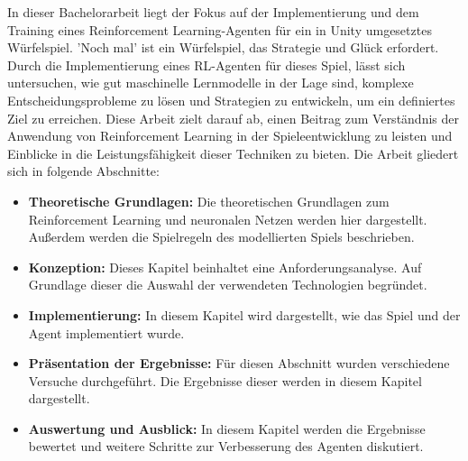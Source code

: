In dieser Bachelorarbeit liegt der Fokus auf der Implementierung und dem Training eines Reinforcement Learning-Agenten für ein in Unity umgesetztes Würfelspiel. 'Noch mal' ist ein Würfelspiel, das Strategie und Glück erfordert.  Durch die Implementierung eines RL-Agenten für dieses Spiel, lässt sich untersuchen, wie gut maschinelle Lernmodelle in der Lage sind, komplexe Entscheidungsprobleme zu lösen und Strategien zu entwickeln, um ein definiertes Ziel zu erreichen. Diese Arbeit zielt darauf ab, einen Beitrag zum Verständnis der Anwendung von Reinforcement Learning in der Spieleentwicklung zu leisten und Einblicke in die Leistungsfähigkeit dieser Techniken zu bieten. 
\newpage
Die Arbeit gliedert sich in folgende Abschnitte:
\begin{itemize}[noitemsep]
\item \textbf{Theoretische Grundlagen:} Die theoretischen Grundlagen zum Reinforcement Learning und neuronalen Netzen werden hier dargestellt. Außerdem werden die Spielregeln des modellierten Spiels beschrieben.
\item \textbf{Konzeption:} Dieses Kapitel beinhaltet eine Anforderungsanalyse. Auf Grundlage dieser die Auswahl der verwendeten Technologien begründet.
\item \textbf{Implementierung:} In diesem Kapitel wird dargestellt, wie das Spiel und der Agent implementiert wurde.
\item \textbf{Präsentation der Ergebnisse:} Für diesen Abschnitt wurden verschiedene Versuche durchgeführt. Die Ergebnisse dieser werden in diesem Kapitel dargestellt. 
\item \textbf{Auswertung und Ausblick:} In diesem Kapitel werden die Ergebnisse bewertet und weitere Schritte zur Verbesserung des Agenten diskutiert.
\end{itemize}